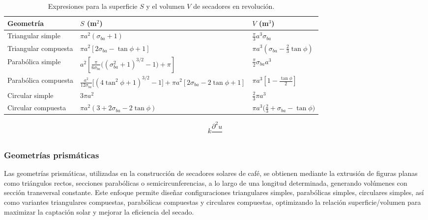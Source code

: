 \documentclass[12pt]{article}
\begin{document}
\begin{table}[h!]
\centering
\begin{center}
\begin{tabular}{|p{4cm}|p{6cm}|p{5cm}|}
\hline
\textbf{Geometría} & \textbf{$S$ (m$^2$)} & \textbf{$V$ (m$^3$)} \\
\hline
Triangular simple & 
$\pi a^2(\sigma_{ba}+1)$ &
$\frac{\pi}{3}a^3\sigma_{ba}$ \\
\hline
Triangular compuesta & 
$\pi a^2[2\sigma_{ba} - \tan\phi + 1]$ &
$\pi a^3\left(\sigma_{ba} - \frac{2}{3}\tan\phi\right)$ \\
\hline
Parabólica simple & 
$a^2\left[\frac{\pi}{6\sigma_{ba}}\Big((\sigma_{ba}^2+1)^{3/2}-1\Big)+\pi\right]$ &
$\frac{\pi}{2}\sigma_{ba}a^3$ \\
\hline
Parabólica compuesta & 
$\frac{a^2}{12\sigma_{ba}}\Big[(4\tan^2\phi+1)^{3/2}-1\Big] + \pi a^2[2\sigma_{ba} - 2\tan\phi + 1]$ &
$\pi a^3\left[1 - \frac{\tan\phi}{2}\right]$ \\
\hline
Circular simple & 
$3\pi a^2$ &
$\frac{2}{3}\pi a^3$ \\
\hline
Circular compuesta & 
$\pi a^2(3 + 2\sigma_{ba} - 2\tan\phi)$ &
$\pi a^3\Big(\frac{2}{3} + \sigma_{ba} - \tan\phi\Big)$ \\
\hline
\end{tabular}
\end{center}
\caption{Expresiones para la superficie $S$ y el volumen $V$ de secadores en revolución.}
\label{tab:geometria_secadores_uno}
\end{table}

 \clearpage

$$k\frac{\partial^2 u}{}$$

\subsubsection{Geometrías prismáticas}

Las geometrías prismáticas, utilizadas en la construcción de secadores solares de café, se obtienen mediante la extrusión de figuras planas como triángulos rectos, secciones parabólicas o semicircunferencias, a lo largo de una longitud determinada, generando volúmenes con sección transversal constante. Este enfoque permite diseñar configuraciones triangulares simples, parabólicas simples, circulares simples, así como variantes triangulares compuestas, parabólicas compuestas y circulares compuestas, optimizando la relación superficie/volumen para maximizar la captación solar y mejorar la eficiencia del secado.\\
\end{document}
